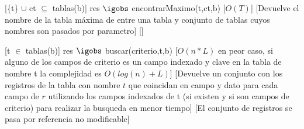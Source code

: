 \begin{Interfaz}
    [\{t\} $\cup$ ct $\subseteq$ tablas(b)]%
    {res $\igobs$ encontrarMaximo(t,ct,b)}%
    [$O(T)$]%
    [Devuelve el nombre de la tabla m\'axima de entre una tabla y conjunto de tablas cuyos nombres son pasados por parametro]%
    []%
    
    [t $\in$ tablas(b)]%
    {res $\igobs$ buscar(criterio,t,b)}%
    [$O(n*L)$ en peor caso, si alguno de los campos de criterio es un campo indexado y clave en la tabla de nombre t la complejidad es $O(log(n) + L)$]%
    [Devuelve un conjunto con los registros de la tabla con nombre $t$ que coincidan en campo y dato para cada campo de $r$ utilizando los campos indexados de t (si existen y si son campos de criterio) para realizar la busqueda en menor tiempo]%
    [El conjunto de registros se pasa por referencia no modificable]%
\end{Interfaz}    

